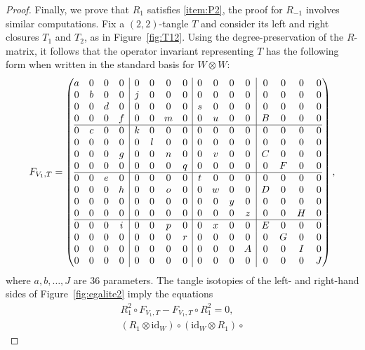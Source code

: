 \documentclass[pdftex]{sigma}
\numberwithin{equation}{section}
\theoremstyle{definition}
\begin{document}
\begin{proof}
Finally, we prove that $R_{1}$ satisfies \eqref{item:P2}, the proof for $R_{-1}$
involves similar computations. Fix a $(2,2)$-tangle $T$ and consider its
left and right closures $T_1$ and $T_2$, as in
Figure~\ref{fig:T12}. Using the degree-preservation of the $R$-matrix, it
follows that the operator invariant representing $T$
has the following form when written in the standard basis for $W \otimes W$:
\[
F_{V_1,T}=\left(\begin{array}{@{}cccc|cccc|cccc|cccc@{}}
a & 0 & 0 & 0 & 0 & 0 & 0 & 0 & 0 & 0 & 0 & 0 & 0 & 0 & 0 & 0 \\
0 & b & 0 & 0 & j & 0 & 0 & 0 & 0 & 0 & 0 & 0 & 0 & 0 & 0 & 0 \\
0 & 0 & d & 0 & 0 & 0 & 0 & 0 & s & 0 & 0 & 0 & 0 & 0 & 0 & 0 \\
0 & 0 & 0 & f & 0 & 0 & m & 0 & 0 & u & 0 & 0 & B & 0 & 0 & 0 \\\hline
0 & c & 0 & 0 & k & 0 & 0 & 0 & 0 & 0 & 0 & 0 & 0 & 0 & 0 & 0 \\
0 & 0 & 0 & 0 & 0 & l & 0 & 0 & 0 & 0 & 0 & 0 & 0 & 0 & 0 & 0 \\
0 & 0 & 0 & g & 0 & 0 & n & 0 & 0 & v & 0 & 0 & C & 0 & 0 & 0 \\
0 & 0 & 0 & 0 & 0 & 0 & 0 & q & 0 & 0 & 0 & 0 & 0 & F & 0 & 0 \\\hline
0 & 0 & e & 0 & 0 & 0 & 0 & 0 & t & 0 & 0 & 0 & 0 & 0 & 0 & 0 \\
0 & 0 & 0 & h & 0 & 0 & o & 0 & 0 & w & 0 & 0 & D & 0 & 0 & 0 \\
0 & 0 & 0 & 0 & 0 & 0 & 0 & 0 & 0 & 0 & y & 0 & 0 & 0 & 0 & 0 \\
0 & 0 & 0 & 0 & 0 & 0 & 0 & 0 & 0 & 0 & 0 & z & 0 & 0 & H & 0 \\\hline
0 & 0 & 0 & i & 0 & 0 & p & 0 & 0 & x & 0 & 0 & E & 0 & 0 & 0 \\
0 & 0 & 0 & 0 & 0 & 0 & 0 & r & 0 & 0 & 0 & 0 & 0 & G & 0 & 0 \\
0 & 0 & 0 & 0 & 0 & 0 & 0 & 0 & 0 & 0 & 0 & A & 0 & 0 & I & 0 \\
0 & 0 & 0 & 0 & 0 & 0 & 0 & 0 & 0 & 0 & 0 & 0 & 0 & 0 & 0 & J \\
 \end{array}\right),
\]
where $a, b, \dots, J$ are $36$ parameters. The tangle isotopies of
the left- and right-hand sides of Figure~\ref{fig:egalite2}
imply the equations
\begin{gather*}
 R_1^2 \circ F_{V_1,T} - F_{V_1,T} \circ R_1^2 = 0, \\
(R_1 \otimes \text{id}_W) \circ (\text{id}_W \otimes R_1) \circ

\end{gather*}
\end{proof}
\end{document}
